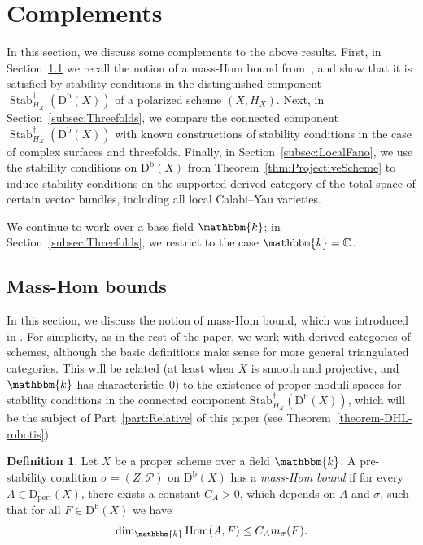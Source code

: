 \documentclass[11pt, reqno]{amsart}
\numberwithin{equation}{section}
\theoremstyle{plain}
\theoremstyle{remark}
\theoremstyle{definition}
\newtheorem{definition}[theorem]{Definition}
\theoremstyle{italicsname}
\newcommand{\Db}{\mathrm{D^b}}
\newcommand{\Dperf}{\mathrm{D}_{\mathrm{perf}}}
\DeclareMathOperator{\Stab}{Stab}
\newcommand{\Stabdagger}{\mathrm{Stab}^\dagger}
\DeclareMathOperator{\Hom}{Hom}
\newcommand{\cP}{\mathscr{P}}
\newcommand{\KK}{\mathbbm{k}}
\def\CC{\ensuremath{\mathbb{C}}}
\begin{document}
\section{Complements}\label{sec:Complements}

In this section, we discuss some complements to the above results. 
First, in Section~\ref{subsec:MassHomBounds} we recall the notion of a mass-Hom bound from~\cite{DHL-robotis}, and show that it is satisfied by stability conditions in the distinguished component $\Stab^\dagger_{H_X}(\Db(X))$ of a polarized scheme $(X, H_X)$. 
Next, in Section~\ref{subsec:Threefolds}, we compare the connected component $\Stab^\dagger_{H_X}(\Db(X))$ with known constructions of stability conditions in the case of complex surfaces and threefolds.
Finally, in Section~\ref{subsec:LocalFano}, we use the stability conditions on $\Db(X)$ from Theorem~\ref{thm:ProjectiveScheme} to induce stability conditions on the supported derived category of the total space of certain vector bundles, including all local Calabi--Yau varieties.


We continue to work over a base field $\KK$; in Section~\ref{subsec:Threefolds}, we restrict to the case $\KK=\CC$.

\subsection{Mass-Hom bounds}\label{subsec:MassHomBounds} 

In this section, we discuss the notion of mass-Hom bound, which was introduced in \cite[Definition 2.7]{DHL-robotis}.
For simplicity, as in the rest of the paper, we work with derived categories of schemes, although the basic definitions make sense for more general triangulated categories.
This will be related (at least when $X$ is smooth and projective, and $\KK$ has characteristic~$0$) to the existence of proper moduli spaces for stability conditions in the connected component $\Stabdagger_{H_X}(\Db(X))$, which will be the subject of Part~\ref{part:Relative} of this paper (see Theorem~\ref{theorem-DHL-robotis}).

\begin{definition}\label{definition-mass-hom}
Let $X$ be a proper scheme over a field $\KK$. 
A pre-stability condition $\sigma=(Z,\cP)$ on $\Db(X)$ has a \emph{mass-Hom bound} if for every $A\in \Dperf(X)$, there exists a constant $C_A > 0$, which depends on $A$ and $\sigma$, such that for all $F\in\Db(X)$ we have 
\begin{equation}\label{mass-hom-inequality}
\dim_\KK\Hom(A,F)\leq C_A m_{\sigma}(F). 
\end{equation}
\end{definition}
\end{document}
